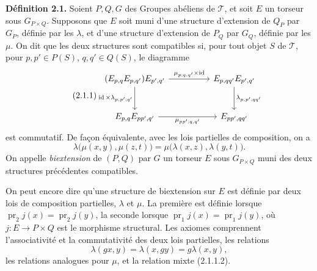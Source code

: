 \documentclass[11pt]{article}
\providecommand{\pr}{\operatorname{pr}}
\providecommand{\id}{\operatorname{id}}
\providecommand{\id}{\mathrm{id}}
\begin{document}
\textbf{Définition 2.1.}  Soient \(P,Q,G\) des Groupes abéliens de \(\mathcal T\), et soit \(E\) un torseur sous \(G_{P\times Q}\).  Supposons que \(E\) soit muni d'une structure d'extension de \(Q_P\) par \(G_P\), définie par les \(\lambda\), et d'une structure d'extension de \(P_Q\) par \(G_Q\), définie par les \(\mu\).  On dit que les deux structures sont compatibles si, pour tout objet \(S\) de \(\mathcal T\), pour \(p,p'\in P(S)\), \(q,q'\in Q(S)\), le diagramme
\begin{equation}\tag{2.1.1}
\begin{tikzcd}[column sep=huge,row sep=large]
(E_{p,q}E_{p,q'})E_{p',q'}
\arrow[r,"\mu_{p;q,q'}\times\id"]
\arrow[d,"\id\times\lambda_{p,p';q'}"']
& E_{p,qq'}E_{p',q'}\arrow[d,"\lambda_{p,p';qq'}"]\\
E_{p,q}E_{pp',q'}\arrow[r,"\mu_{pp';q,q'}"']&E_{pp',qq'}
\end{tikzcd}
\end{equation}
est commutatif.  De façon équivalente, avec les lois partielles de composition, on a
\begin{equation}\tag{2.1.1.2}
  \lambda\bigl(\mu(x,y),\mu(z,t)\bigr)
  =
  \mu\bigl(\lambda(x,z),\lambda(y,t)\bigr).
\end{equation}
On appelle \emph{biextension} de \((P,Q)\) par \(G\) un torseur \(E\) sous \(G_{P\times Q}\) muni des deux structures précédentes compatibles.

On peut encore dire qu'une structure de biextension sur \(E\) est définie par deux lois de composition partielles, \(\lambda\) et \(\mu\).  La première est définie lorsque \(\pr_2 j(x)=\pr_2 j(y)\), la seconde lorsque \(\pr_1 j(x)=\pr_1 j(y)\), où \(j:E\to P\times Q\) est le morphisme structural.  Les axiomes comprennent l'associativité et la commutativité des deux lois partielles, les relations
\begin{equation}\tag{2.1.1.1}
  \lambda(gx,y)=\lambda(x,gy)=g\lambda(x,y),
\end{equation}
les relations analogues pour \(\mu\), et la relation mixte (2.1.1.2).
\end{document}
